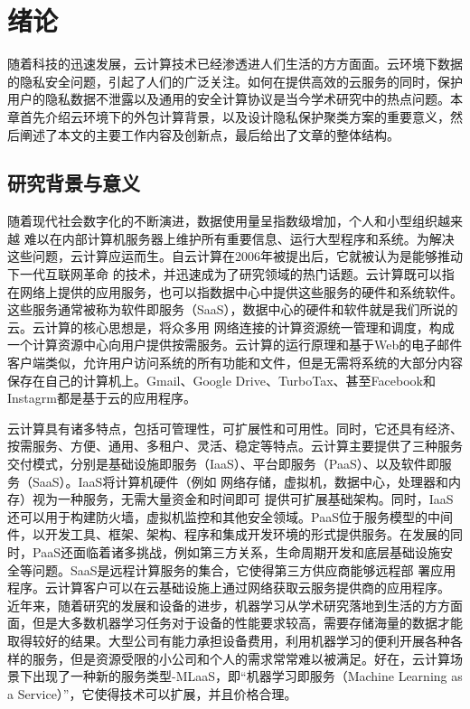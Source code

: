 \chapter{绪论}
随着科技的迅速发展，云计算技术已经渗透进人们生活的方方面面。云环境下数据的隐私安全问题，引起了人们的广泛关注。如何在提供高效的云服务的同时，保护用户的隐私数据不泄露以及通用的安全计算协议是当今学术研究中的热点问题。本章首先介绍云环境下的外包计算背景，以及设计隐私保护聚类方案的重要意义，然后阐述了本文的主要工作内容及创新点，最后给出了文章的整体结构。
\section{研究背景与意义}
随着现代社会数字化的不断演进，数据使用量呈指数级增加，个人和小型组织越来越 难以在内部计算机服务器上维护所有重要信息、运行大型程序和系统。为解决这些问题，云计算应运而生。自云计算在2006年被提出后，它就被认为是能够推动下一代互联网革命 的技术，并迅速成为了研究领域的热门话题\cite{sadiku2014cloud}。云计算既可以指在网络上提供的应用服务，也可以指数据中心中提供这些服务的硬件和系统软件。这些服务通常被称为软件即服务（SaaS），数据中心的硬件和软件就是我们所说的云。云计算的核心思想是，将众多用 网络连接的计算资源统一管理和调度，构成一个计算资源中心向用户提供按需服务。云计算的运行原理和基于Web的电子邮件客户端类似，允许用户访问系统的所有功能和文件，但是无需将系统的大部分内容保存在自己的计算机上。Gmail、Google Drive、TurboTax、甚至Facebook和Instagrm都是基于云的应用程序。

云计算具有诸多特点，包括可管理性，可扩展性和可用性。同时，它还具有经济、按需服务、方便、通用、多租户、灵活、稳定等特点。云计算主要提供了三种服务交付模式，分别是基础设施即服务（IaaS）、平台即服务（PaaS）、以及软件即服务（SaaS）。IaaS将计算机硬件（例如 网络存储，虚拟机，数据中心，处理器和内存）视为一种服务，无需大量资金和时间即可 提供可扩展基础架构。同时，IaaS还可以用于构建防火墙，虚拟机监控和其他安全领域\cite{manvi2014resource}。PaaS位于服务模型的中间件，以开发工具、框架、架构、程序和集成开发环境的形式提供服务。在发展的同时，PaaS还面临着诸多挑战，例如第三方关系，生命周期开发和底层基础设施安全等问题\cite{rani2014comparative}。SaaS是远程计算服务的集合，它使得第三方供应商能够远程部 署应用程序。云计算客户可以在云基础设施上通过网络获取云服务提供商的应用程序\cite{antonopoulos2010cloud}。
近年来，随着研究的发展和设备的进步，机器学习从学术研究落地到生活的方方面面，但是大多数机器学习任务对于设备的性能要求较高，需要存储海量的数据才能取得较好的结果。大型公司有能力承担设备费用，利用机器学习的便利开展各种各样的服务，但是资源受限的小公司和个人的需求常常难以被满足。好在，云计算场景下出现了一种新的服务类型-MLaaS，即“机器学习即服务（Machine Learning as a Service）”，它使得技术可以扩展，并且价格合理\cite{ribeiro2015mlaas}。

